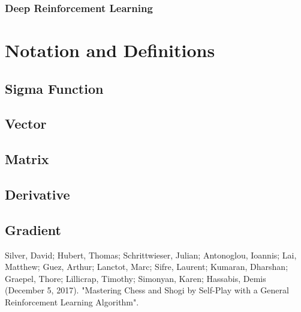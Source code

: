 \documentclass[titlepage]{article}
\begin{document}
\subsubsection{Deep Reinforcement Learning}

\newpage

\section{Notation and Definitions}
\subsection{Sigma Function}
\subsection{Vector}
\subsection{Matrix}
\subsection{Derivative}
\subsection{Gradient}

\newpage

\begin{thebibliography}{100}
Silver, David; Hubert, Thomas; Schrittwieser, Julian; Antonoglou, Ioannis; Lai, Matthew; Guez, Arthur; Lanctot, Marc; Sifre, Laurent; Kumaran, Dharshan; Graepel, Thore; Lillicrap, Timothy; Simonyan, Karen; Hassabis, Demis (December 5, 2017). "Mastering Chess and Shogi by Self-Play with a General Reinforcement Learning Algorithm".

\end{thebibliography}
\end{document}
